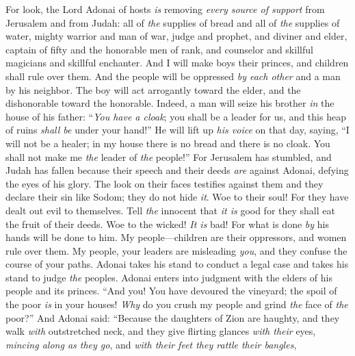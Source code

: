 \begin{biblechapter} %
 For look, the Lord Adonai of hosts \textit{is} removing \textit{every source of support} 
from Jerusalem and from Judah: 
all of \textit{the} supplies of bread 
and all of \textit{the} supplies of water,
\verse mighty warrior and man of war, 
judge and prophet, 
and diviner and elder,
\verse captain of fifty and the honorable men of rank, 
and counselor and skillful magicians and skillful enchanter.
\verse And I will make boys their princes, 
and children shall rule over them.
\verse And the people will be oppressed \textit{by each other} 
and a man by his neighbor. 
The boy will act arrogantly toward the elder, 
and the dishonorable toward the honorable.
\verse Indeed, a man will seize his brother 
\textit{in} the house of his father: 
“\textit{You have a cloak}; 
you shall be a leader for us, 
and this heap of ruins \textit{shall be} under your hand!”
\verse He will lift up \textit{his voice} on that day, saying, 
“I will not be a healer; 
in my house there is no bread 
and there is no cloak. 
You shall not make me \textit{the} leader of \textit{the} people!”
\verse For Jerusalem has stumbled, 
and Judah has fallen 
because their speech and their deeds \textit{are} against Adonai, 
defying the eyes of his glory.
\verse The look on their faces testifies against them 
and they declare their sin like Sodom; 
they do not hide \textit{it}. 
Woe to their soul! 
For they have dealt out evil to themselves.
\verse Tell \textit{the} innocent that \textit{it is} good 
for they shall eat the fruit of their deeds.
\verse Woe to the wicked! \textit{It is} bad! 
For what is done \textit{by} his hands will be done to him.
\verse My people—children are their oppressors, 
and women rule over them. 
My people, your leaders are misleading \textit{you}, 
and they confuse the course of your paths.
\verse Adonai takes his stand to conduct a legal case 
and takes his stand to judge \textit{the} peoples.
\verse Adonai enters into judgment with the elders of his people and its princes. 
“And you! You have devoured the vineyard; 
the spoil of the poor \textit{is} in your houses!
\verse \textit{Why} do you crush my people 
and grind \textit{the} face of \textit{the} poor?”
 And Adonai said: “Because the daughters of Zion are haughty, 
and they walk \textit{with} outstretched neck, 
and they give flirting glances \textit{with their} eyes, 
\textit{mincing along as they go}, 
and \textit{with their feet they rattle their bangles},

\end{biblechapter}
